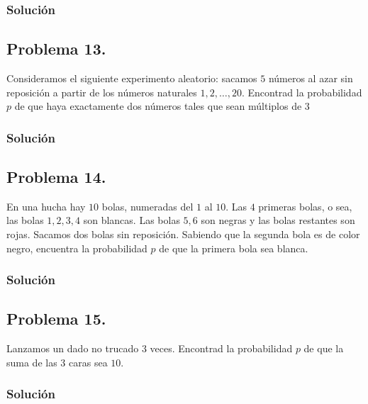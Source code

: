 \documentclass[
]{article}
\begin{document}
\hypertarget{soluciuxf3n-12}{%
\subsubsection{Solución}\label{soluciuxf3n-12}}

\hypertarget{problema-13.}{%
\subsection{Problema 13.}\label{problema-13.}}

Consideramos el siguiente experimento aleatorio: sacamos \(5\) números
al azar sin reposición a partir de los números naturales
\(1,2,\dots,20\). Encontrad la probabilidad \(p\) de que haya
exactamente dos números tales que sean múltiplos de \(3\)

\hypertarget{soluciuxf3n-13}{%
\subsubsection{Solución}\label{soluciuxf3n-13}}

\hypertarget{problema-14.}{%
\subsection{Problema 14.}\label{problema-14.}}

En una hucha hay \(10\) bolas, numeradas del \(1\) al \(10\). Las \(4\)
primeras bolas, o sea, las bolas \(1,2,3,4\) son blancas. Las bolas
\(5,6\) son negras y las bolas restantes son rojas. Sacamos dos bolas
sin reposición. Sabiendo que la segunda bola es de color negro,
encuentra la probabilidad \(p\) de que la primera bola sea blanca.

\hypertarget{soluciuxf3n-14}{%
\subsubsection{Solución}\label{soluciuxf3n-14}}

\hypertarget{problema-15.}{%
\subsection{Problema 15.}\label{problema-15.}}

Lanzamos un dado no trucado 3 veces. Encontrad la probabilidad \(p\) de
que la suma de las 3 caras sea \(10\).

\hypertarget{soluciuxf3n-15}{%
\subsubsection{Solución}\label{soluciuxf3n-15}}
\end{document}

